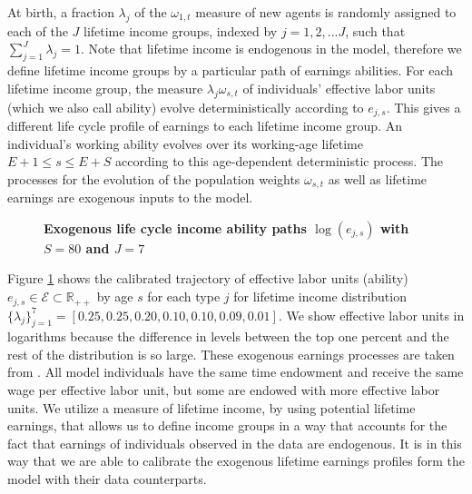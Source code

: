 \documentclass[letterpaper,12pt]{article}
\theoremstyle{definition}
\begin{document}
\begin{spacing}{1.5}
    At birth, a fraction $\lambda_j$ of the $\omega_{1,t}$ measure of new agents is randomly assigned to each of the $J$ lifetime income groups, indexed by $j=1,2,...J$, such that $\sum_{j=1}^J\lambda_j=1$. Note that lifetime income is endogenous in the model, therefore we define lifetime income groups by a particular path of earnings abilities. For each lifetime income group, the measure $\lambda_j\omega_{s,t}$ of individuals' effective labor units (which we also call ability) evolve deterministically according to $e_{j,s}$. This gives a different life cycle profile of earnings to each lifetime income group.  An individual's working ability evolves over its working-age lifetime $E+1\leq s \leq E+S$ according to this age-dependent deterministic process. The processes for the evolution of the population weights $\omega_{s,t}$ as well as lifetime earnings are exogenous inputs to the model.

    \begin{figure}[htb]\centering \captionsetup{width=4.0in}
      \caption{\label{FigLogAbility}\textbf{Exogenous life cycle income ability paths $\log(e_{j,s})$ with $S=80$ and $J=7$}}
    \end{figure}

    Figure \ref{FigLogAbility} shows the calibrated trajectory of effective labor units (ability) $e_{j,s}\in\mathcal{E}\subset\mathbb{R}_{++}$ by age $s$ for each type $j$ for lifetime income distribution $\{\lambda_j\}_{j=1}^7 = [0.25,0.25,0.20,0.10,0.10,0.09,0.01]$. We show effective labor units in logarithms because the difference in levels between the top one percent and the rest of the distribution is so large. These exogenous earnings processes are taken from \citet{DEMPRW2015}.  All model individuals have the same time endowment and receive the same wage per effective labor unit, but some are endowed with more effective labor units. We utilize a measure of lifetime income, by using potential lifetime earnings, that allows us to define income groups in a way that accounts for the fact that earnings of individuals observed in the data are endogenous.  It is in this way that we are able to calibrate the exogenous lifetime earnings profiles form the model with their data counterparts.



\end{spacing}
\end{document}
